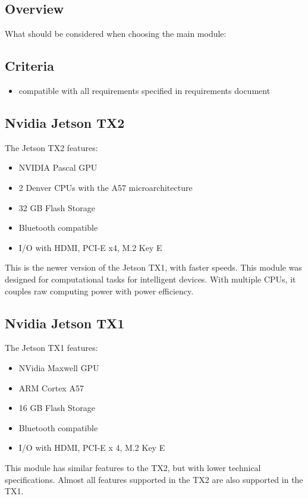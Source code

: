\documentclass[onecolumn, draftclsnofoot,10pt, compsoc]{IEEEtran}
\begin{document}
\subsection{Overview}
What should be considered when choosing the main module:
\subsection{Criteria}
\begin{itemize}
    \item compatible with all requirements specified in requirements document
\end{itemize}

\subsection{Nvidia Jetson TX2}
The Jetson TX2 features:
\begin{itemize}
    \item NVIDIA Pascal GPU
    \item 2 Denver CPUs with the A57 microarchitecture
    \item 32 GB Flash Storage
    \item Bluetooth compatible
    \item I/O with HDMI, PCI-E x4, M.2 Key E
\end{itemize}
This is the newer version of the Jetson TX1, with faster speeds. This module was designed for computational tasks for intelligent devices. With multiple CPUs, it couples raw computing power with power efficiency. 
~\cite{tx2:specs}

\subsection{Nvidia Jetson TX1}
The Jetson TX1 features:
\begin{itemize}
    \item NVidia Maxwell GPU
    \item ARM Cortex A57
    \item 16 GB Flash Storage
    \item Bluetooth compatible
    \item I/O with HDMI, PCI-E x 4, M.2 Key E
\end{itemize}
This module has similar features to the TX2, but with lower technical specifications. Almost all features supported in the TX2 are also supported in the TX1.
~\cite{tx1:specs}
\end{document}
